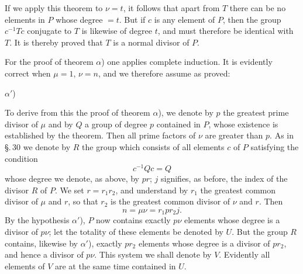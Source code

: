 
If we apply this theorem to $\nu = t$, it follows that apart from $T$ there can be no elements in $P$ whose degree $= t$. But if $c$ is any element of $P$, then the group $c^{-1}Tc$ conjugate to $T$ is likewise of degree $t$, and must therefore be identical with $T$. It is thereby proved that $T$ is a normal divisor of $P$.

For the proof of theorem $\alpha$) one applies complete induction. It is evidently correct when $\mu = 1$, $\nu = n$, and we therefore assume as proved:

$\alpha'$) 

To derive from this the proof of theorem $\alpha$), we denote by $p$ the greatest prime divisor of $\mu$ and by $Q$ a group of degree $p$ contained in $P$, whose existence is established by the  theorem. Then all prime factors of $\nu$ are greater than $p$. As in \S.\,30 we denote by $R$ the group which consists of all elements $c$ of $P$ satisfying the condition
\[
c^{-1}Qc = Q
\]
whose degree we denote, as above, by $pr$; $j$ signifies, as before, the index of the divisor $R$ of $P$. We set $r = r_1 r_2$, and understand by $r_1$ the greatest common divisor of $\mu$ and $r$, so that $r_2$ is the greatest common divisor of $\nu$ and $r$. Then
\[
n = \mu\nu = r_1 p r_2 j.
\]
By the hypothesis $\alpha'$), $P$ now contains exactly $p\nu$ elements whose degree is a divisor of $p\nu$; let the totality of these elements be denoted by $U$. But the group $R$ contains, likewise by $\alpha'$), exactly $pr_2$ elements whose degree is a divisor of $pr_2$, and hence a divisor of $p\nu$. This system we shall denote by $V$. Evidently all elements of $V$ are at the same time contained in $U$.
